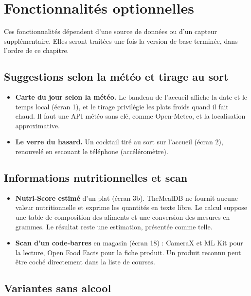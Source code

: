 \chapter{Fonctionnalités optionnelles}

Ces fonctionnalités dépendent d'une source de données ou d'un capteur
supplémentaire. Elles seront traitées une fois la version de base terminée,
dans l'ordre de ce chapitre.

\section{Suggestions selon la météo et tirage au sort}

\begin{itemize}
  \item \textbf{Carte du jour selon la météo.} Le bandeau de l'accueil
        affiche la date et le temps local (écran 1), et le tirage privilégie
        les plats froids quand il fait chaud. Il faut une API météo sans clé,
        comme Open-Meteo, et la localisation approximative.
  \item \textbf{Le verre du hasard.} Un cocktail tiré au sort sur l'accueil
        (écran 2), renouvelé en secouant le téléphone (accéléromètre).
\end{itemize}

\section{Informations nutritionnelles et scan}

\begin{itemize}
  \item \textbf{Nutri-Score estimé} d'un plat (écran 3b). TheMealDB ne
        fournit aucune valeur nutritionnelle et exprime les quantités en
        texte libre. Le calcul suppose une table de composition des
        aliments et une conversion des mesures en grammes. Le résultat
        reste une estimation, présentée comme telle.
  \item \textbf{Scan d'un code-barres} en magasin (écran 18) : CameraX et
        ML Kit pour la lecture, Open Food Facts pour la fiche produit.
        Un produit reconnu peut être coché directement dans la liste de
        courses.
\end{itemize}

\section{Variantes sans alcool}

